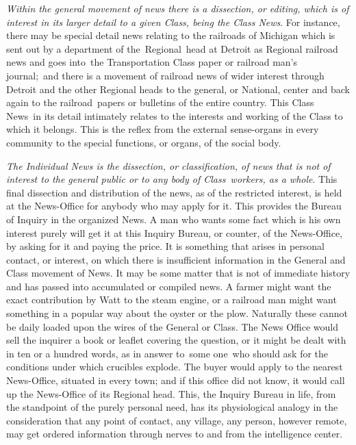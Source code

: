 \documentclass[twoside,symmetric,nobib,justified]{tufte-book}
\begin{document}
\vspace{0.05in}

\emph{Within the general movement of news there is a dissection, or
editing, which is of interest in its larger detail to a given Class,
being the Class News}. For instance, there may be special detail news
relating to the railroads of Michigan which is sent out by a department
of the~Regional~head at Detroit as Regional railroad news and goes
into~the Transportation Class paper or railroad man's journal;~and there
is a movement of railroad news of wider interest through Detroit and the
other Regional heads to the general, or National, center and back again
to the railroad~papers or bulletins of the entire country. This Class
News~in its detail intimately relates to the interests and working of
the Class to which it belongs. This is the reflex from the external
sense-organs in every community to the special functions, or organs, of
the social body.~

\vspace{0.05in}

\emph{The Individual News is the dissection, or classification, of news
that is not of interest to the general public or to any body of
Class~workers, as a whole}. This final dissection and distribution of
the news, as of the restricted interest, is held at the News-Office for
anybody who may apply for it. This provides the Bureau of Inquiry in the
organized News. A man who wants some fact which is his own interest
purely will get it at this Inquiry Bureau, or counter, of the
News-Office, by asking for it and paying the price. It is something that
arises in personal contact, or interest, on which there is insufficient
information in the General and Class movement of News. It may be some
matter that is not of immediate history and has passed into accumulated
or compiled news. A farmer might want the exact contribution by Watt to
the steam engine, or a railroad man might want something in a popular
way about the oyster or the plow. Naturally these cannot be daily loaded
upon the wires of the General or Class. The News Office would sell the
inquirer a book or leaflet covering the question, or it might be dealt
with in ten or a hundred words, as in answer to~some one~who should ask
for the conditions under which crucibles explode. The buyer would apply
to the nearest News-Office, situated in every town; and if this office
did not know, it would call up the News-Office of its Regional head.
This, the Inquiry Bureau in life, from the standpoint of the purely
personal need, has its physiological analogy in the consideration that
any point of contact, any village, any person, however remote, may get
ordered information through nerves to and from the intelligence center.~
\end{document}
